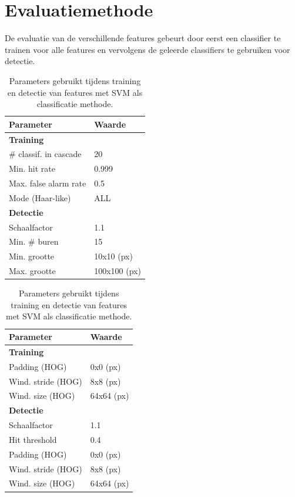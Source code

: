 \section{Evaluatiemethode} \label{sec:eval_hfdst4}
De evaluatie van de verschillende features gebeurt door eerst een classifier te trainen voor alle features en vervolgens de geleerde classifiers te gebruiken voor detectie. 

\begin{table}

\parbox{.45\linewidth}{
	\centering
  	\begin{tabular}{@{}ll@{}} \toprule
    Parameter & Waarde\\ \midrule
    \textbf{Training} & \\ 
    \# classif. in cascade & 20 \\
    Min. hit rate & 0.999 \\
    Max. false alarm rate & 0.5 \\
    Mode (Haar-like) & ALL \\ \midrule
    \textbf{Detectie} & \\ %
    Schaalfactor & 1.1 \\
    Min. \# buren & 15 \\
    Min. grootte & 10x10 (px) \\
    Max. grootte & 100x100 (px) \\ \bottomrule
  \end{tabular}
  \caption{Parameters gebruikt tijdens training en detectie van features met cascade classificatie als classificatie methode.}
  \label{tab:param_ccla}
}
\hfill
\parbox{.45\linewidth}{
	\centering
  	\begin{tabular}{@{}ll@{}} \toprule
    Parameter & Waarde\\ \midrule
    \textbf{Training} & \\ 
    Padding (HOG) & 0x0 (px) \\
    Wind. stride (HOG) & 8x8 (px) \\
    Wind. size (HOG) & 64x64 (px) \\ \midrule
    \textbf{Detectie} & \\ %
	Schaalfactor & 1.1 \\
	Hit threshold & 0.4 \\
    Padding (HOG) & 0x0 (px) \\
    Wind. stride (HOG) & 8x8 (px) \\
    Wind. size (HOG) & 64x64 (px) \\ \bottomrule
  \end{tabular}
  \caption{Parameters gebruikt tijdens training en detectie van features met SVM als classificatie methode.}
  \label{tab:param_svm}
}
\end{table}

